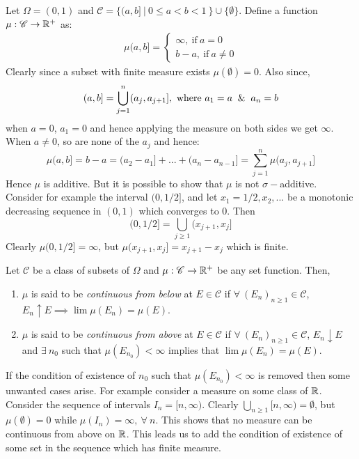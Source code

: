 \begin{example}
  Let $\Omega = (0,1)$ and $ \mathscr{C} = \{(a,b]\ |\ 0\leq a < b < 1\ \}\cup\{\emptyset\}$. Define a function $\mu: \mathscr{C}\to \mathbb{R}^+$ as:
  \begin{align*}
    \mu(a,b] = \begin{cases}
      \infty,\ \text{if}\ a=0\\
      b-a,\ \text{if}\ a\neq 0
    \end{cases}
  \end{align*}
  Clearly since a subset with finite measure exists $\mu(\emptyset) = 0$. Also since,
  \[(a,b] = \bigcup_{j=1}^n (a_j,a_{j+1}],\ \text{where}\ a_1 = a \And a_n=b\] 
  when $a=0$, $a_1 = 0$ and hence applying the measure on both sides we get $\infty$. When $a\neq 0$, so are none of the $a_j$ and hence:
  \[\mu(a,b] = b-a = (a_2 - a_1] + ... + (a_n - a_{n-1}] = \sum_{j=1}^n\mu(a_j,a_{j+1}]\]
  Hence $\mu$ is additive. But it is possible to show that $\mu$ is not $\sigma-$additive. Consider for example the interval $(0,1/2]$, and let $x_1=1/2,x_2,...$ be a monotonic decreasing sequence in $(0,1)$ which converges to $0$. Then
  \[(0,1/2] = \bigcup_{j\geq 1} (x_{j+1}, x_j]\]
  Clearly $\mu(0,1/2] = \infty$, but $\mu(x_{j+1},x_j] = x_{j+1} - x_j$ which is finite.
\end{example}
\begin{definition}
  Let $ \mathscr{C}$ be a class of subsets of $\Omega$ and $\mu: \mathscr{C}\to \mathbb{R}^+$ be any set function. Then,
  \begin{enumerate}
    \item $\mu$ is said to be \textit{continuous from below} at $E\in \mathscr{C}$ if $\forall\ (E_n)_{n\geq 1}\in \mathscr{C}$, $E_n \uparrow E \implies \lim\mu(E_n) = \mu(E)$.
    \item $\mu$ is said to be \textit{continuous from above} at $E\in \mathscr{C}$ if $\forall\ (E_n)_{n\geq 1}\in \mathscr{C}$, $E_n \downarrow E$ and $\exists\ n_0$ such that $\mu(E_{n_0}) <\infty$ implies that $\lim\mu(E_n)= \mu(E)$. 
  \end{enumerate}
\end{definition}
\begin{remark}
  If the condition of existence of $n_0$ such that $\mu(E_{n_0})<\infty$ is removed then some unwanted cases arise. For example consider a measure on some class of $\mathbb{R}$. Consider the sequence of intervals $I_n = [n,\infty)$. Clearly $\bigcup_{n\geq 1} [n,\infty) = \emptyset$, but $\mu(\emptyset) = 0$ while $\mu(I_n) = \infty,\ \forall\ n$. This shows that no measure can be continuous from above on $\mathbb{R}$. This leads us to add the condition of existence of some set in the sequence which has finite measure. 
\end{remark}
